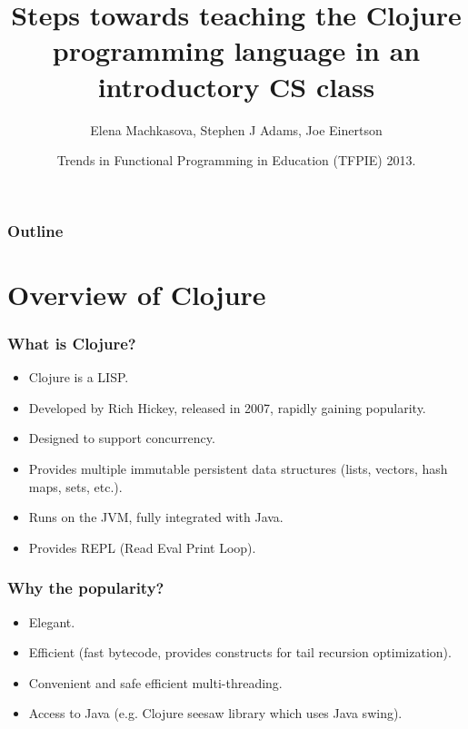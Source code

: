 \documentclass{beamer}
\newcommand{\allcomments}[1]{{#1}}
\newcommand{\joecomment}[1]{{\bf \color{JoesGold}{\allcomments{{#1}}}}}
\begin{document}
\title{Steps towards teaching the Clojure programming language in an introductory CS  class}
\author{Elena Machkasova, Stephen J Adams, Joe Einertson}
\date[May 13, 2013]  
{Trends in Functional Programming in Education (TFPIE) 2013.}

\begin{frame}
  \titlepage
\end{frame}

\begin{frame}

  \frametitle{Outline}
\tableofcontents
\end{frame}

\section{Overview of Clojure}

\begin{frame}
\frametitle{What is Clojure?}
\begin{itemize}
\item Clojure is a LISP.
\item Developed by Rich Hickey, released in 2007, rapidly gaining popularity. 
\item Designed to support concurrency. %
\item Provides multiple immutable persistent data structures (lists, vectors, hash maps, sets, etc.).
\item Runs on the JVM, fully integrated with Java. 
\item Provides REPL (Read Eval Print Loop).
\end{itemize}
\end{frame}

\begin{frame}
\frametitle{Why the popularity?}
\begin{itemize}
\item Elegant.
\item Efficient (fast bytecode, provides constructs for tail recursion optimization).
\item Convenient and safe efficient multi-threading. 
\item Access to Java (e.g. Clojure seesaw library which uses Java swing). 
\end{itemize}
\end{frame}
\end{document}
